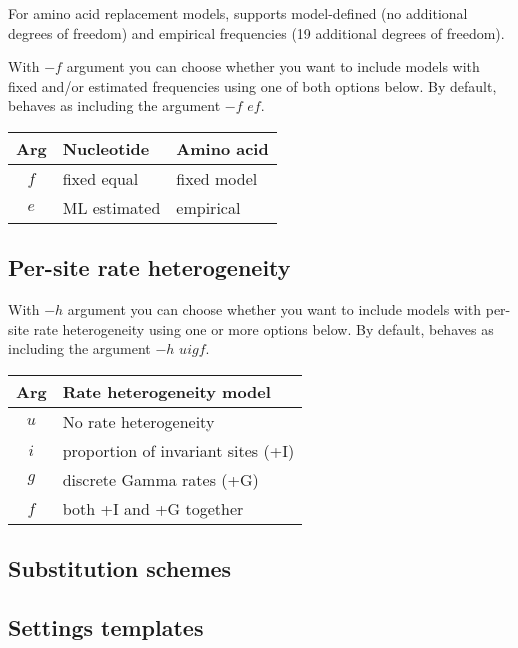 For amino acid replacement models, \modeltest supports model-defined (no additional degrees of freedom) and empirical frequencies (19 additional degrees of freedom).

With $-f$ argument you can choose whether you want to include models with fixed and/or estimated frequencies using one of both options below.
By default, \modeltest behaves as including the argument $-f$ $ef$.

\vspace{1em}
\begin{tabular}{cll}
  {\bf Arg} & {\bf Nucleotide} & {\bf Amino acid} \\
  \hline
    $f$     & fixed equal      & fixed model \\
    $e$     & ML estimated     & empirical \\
\end{tabular}


\subsection{Per-site rate heterogeneity}
\label{sec:arg:ratehet}

With $-h$ argument you can choose whether you want to include models with per-site rate heterogeneity using one or more options below.
By default, \modeltest behaves as including the argument $-h$ $uigf$.

\vspace{1em}
\begin{tabular}{cl}
  {\bf Arg} & {\bf Rate heterogeneity model} \\
  \hline
    $u$     & No rate heterogeneity \\
    $i$     & proportion of invariant sites (+I) \\
    $g$     & discrete Gamma rates (+G) \\
    $f$     & both +I and +G together \\
\end{tabular}


\subsection{Substitution schemes}
\label{sec:arg:subschemes}

\subsection{Settings templates}
\label{sec:arg:templates}

